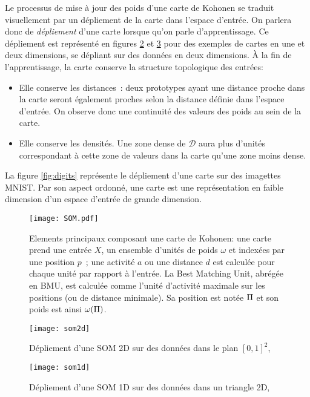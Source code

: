 \documentclass[../main]{subfiles}
\begin{document}
Le processus de mise à jour des poids d'une carte de Kohonen se traduit visuellement par un dépliement de la carte dans l'espace d'entrée. On parlera donc de \emph{dépliement} d'une carte lorsque qu'on parle d'apprentissage. Ce dépliement est représenté en figures \ref{fig:som2d} et \ref{fig:som1d} pour des exemples de cartes en une et deux dimensions, se dépliant sur des données en deux dimensions.
\`A la fin de l'apprentissage, la carte conserve la structure topologique des entrées:
\begin{itemize}
\item Elle conserve les distances~: deux prototypes ayant une distance proche dans la carte seront également proches selon la distance définie dans l'espace d'entrée. On observe donc une continuité des valeurs des poids au sein de la carte.
\item Elle conserve les densités. Une zone dense de $\mathcal{D}$ aura plus d'unités correspondant à cette zone de valeurs dans la carte qu'une zone moins dense.
\end{itemize}
La figure \ref{fig:digits} représente le dépliement d'une carte sur des imagettes MNIST.
Par son aspect ordonné, une carte est une représentation en faible dimension d'un espace d'entrée de grande dimension.

\begin{figure}
    \centering
    \texttt{[image: SOM.pdf]}
    \caption{Elements principaux composant une carte de Kohonen: une carte prend une entrée $X$, un ensemble d'unités de poids $\omega$ et indexées par une position $p$~; une activité $a$ ou une distance $d$ est calculée pour chaque unité par rapport à l'entrée. La Best Matching Unit, abrégée en BMU, est calculée comme l'unité d'activité maximale sur les positions (ou de distance minimale). Sa position est notée $\Pi$ et son poids est ainsi $\omega(\Pi)$.\label{fig:SOM}}
    \end{figure}

    \begin{figure}
        \centering
        \texttt{[image: som2d]}
        \caption{Dépliement d'une SOM 2D sur des données dans le plan $[0,1]^2$, \cite{Kohonen1995SelfOrganizingM} \label{fig:som2d}}
        \end{figure}
        
        \begin{figure}
        \centering
        \texttt{[image: som1d]}
        \caption{Dépliement d'une SOM 1D sur des données dans un triangle 2D, \cite{Kohonen1995SelfOrganizingM}\label{fig:som1d}}
        \end{figure}
\end{document}
